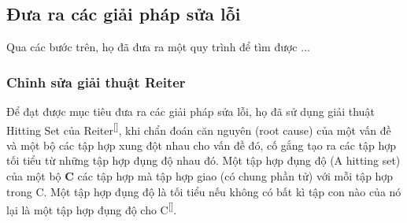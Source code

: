 \subsection{Đưa ra các giải pháp sửa lỗi}
Qua các bước trên, họ đã đưa ra một quy trình để tìm được ...
\subsubsection{Chỉnh sửa giải thuật Reiter}
Để đạt được mục tiêu đưa ra các giải pháp sửa lỗi, họ đã sử dụng giải thuật Hitting Set của Reiter\textsuperscript{[]}, khi chẩn đoán căn nguyên (root cause) của một vấn đề và một bộ các tập hợp xung đột nhau cho vấn đề đó, cố gắng tạo ra các tập hợp tối tiểu từ những tập hợp đụng độ nhau đó. Một tập hợp đụng độ (A hitting set) của một bộ \textbf{C} các tập hợp mà tập hợp giao (có chung phần tử) với mỗi tập hợp trong C. Một tập hợp đụng độ là tối tiểu nếu không có bất kì tập con nào của nó lại là một tập hợp đụng độ cho C\textsuperscript{[]}.
